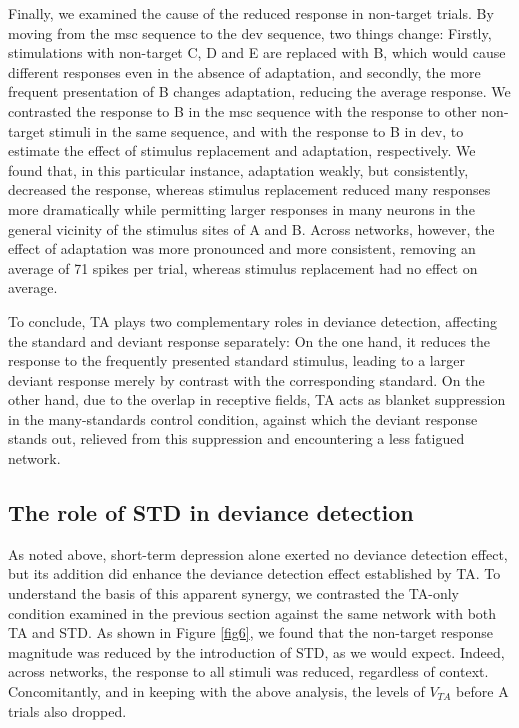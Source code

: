 \documentclass[pdflatex,iicol,sn-basic]{sn-jnl}
\theoremstyle{thmstyleone}%
\theoremstyle{thmstyletwo}%
\theoremstyle{thmstylethree}%
\begin{document}
Finally, we examined the cause of the reduced response in non-target trials. By moving from the msc sequence to the dev sequence, two things change: Firstly, stimulations with non-target C, D and E are replaced with B, which would cause different responses even in the absence of adaptation, and secondly, the more frequent presentation of B changes adaptation, reducing the average response. We contrasted the response to B in the msc sequence with the response to other non-target stimuli in the same sequence, and with the response to B in dev, to estimate the effect of stimulus replacement and adaptation, respectively. We found that, in this particular instance, adaptation weakly, but consistently, decreased the response, whereas stimulus replacement reduced many responses more dramatically while permitting larger responses in many neurons in the general vicinity of the stimulus sites of A and B. Across networks, however, the effect of adaptation was more pronounced and more consistent, removing an average of 71 spikes per trial, whereas stimulus replacement had no effect on average.

To conclude, TA plays two complementary roles in deviance detection, affecting the standard and deviant response separately: On the one hand, it reduces the response to the frequently presented standard stimulus, leading to a larger deviant response merely by contrast with the corresponding standard. On the other hand, due to the overlap in receptive fields, TA acts as blanket suppression in the many-standards control condition, against which the deviant response stands out, relieved from this suppression and encountering a less fatigued network.

\subsection{The role of STD in deviance detection}\label{sec-std}

As noted above, short-term depression alone exerted no deviance detection effect, but its addition did enhance the deviance detection effect established by TA. To understand the basis of this apparent synergy, we contrasted the TA-only condition examined in the previous section against the same network with both TA and STD. As shown in Figure \ref{fig6}, we found that the non-target response magnitude was reduced by the introduction of STD, as we would expect. Indeed, across networks, the response to all stimuli was reduced, regardless of context. Concomitantly, and in keeping with the above analysis, the levels of $V_{TA}$ before A trials also dropped.
\end{document}
